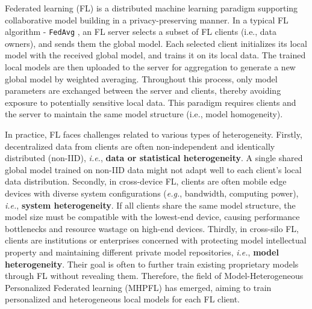 \documentclass[sigconf]{acmart}
\begin{document}
Federated learning (FL) \cite{FedAvg,1w-survey} is a distributed machine learning paradigm supporting collaborative model building in a privacy-preserving manner. In a typical FL algorithm - {\tt{FedAvg}} \cite{FedAvg}, an FL server selects a subset of FL clients (i.e., data owners), and sends them the global model. Each selected client initializes its local model with the received global model, and trains it on its local data. The trained local models are then uploaded to the server for aggregation to generate a new global model by weighted averaging. Throughout this process, only model parameters are exchanged between the server and clients, thereby avoiding exposure to potentially sensitive local data. This paradigm requires clients and the server to maintain the same model structure (i.e., model homogeneity).

In practice, FL faces challenges related to various types of heterogeneity. Firstly, decentralized data from clients are often non-independent and identically distributed (non-IID), \emph{i.e.}, \textbf{data or statistical heterogeneity}. A single shared global model trained on non-IID data might not adapt well to each client's local data distribution.
Secondly, in cross-device FL, clients are often mobile edge devices with diverse system configurations (\emph{e.g.}, bandwidth, computing power), \emph{i.e.}, \textbf{system heterogeneity}. If all clients share the same model structure, the model size must be compatible with the lowest-end device, causing performance bottlenecks and resource wastage on high-end devices.
Thirdly, in cross-silo FL, clients are institutions or enterprises concerned with protecting model intellectual property and maintaining different private model repositories, \emph{i.e.}, \textbf{model heterogeneity}. Their goal is often to further train existing proprietary models through FL without revealing them. 
Therefore, the field of Model-Heterogeneous Personalized Federated learning (MHPFL) has emerged, aiming to train personalized and heterogeneous local models for each FL client.
\end{document}
